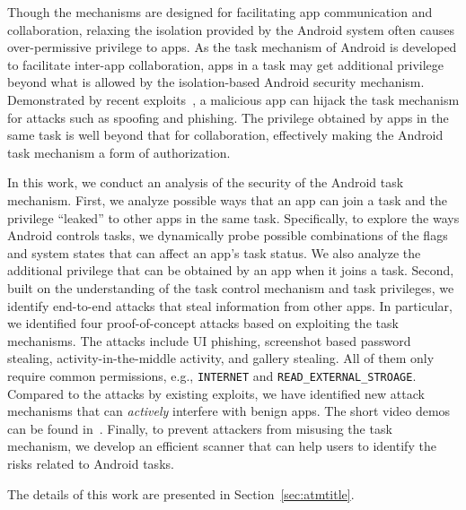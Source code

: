 \documentclass[letterpaper,12pt]{article}
\begin{document}
Though the mechanisms are designed for facilitating app communication
and collaboration, relaxing the isolation provided by the Android
system often causes over-permissive privilege to apps. 
As the task mechanism of Android is developed to facilitate inter-app
collaboration, apps in a task may get additional privilege beyond what
is allowed by the isolation-based Android security
mechanism. Demonstrated by recent exploits~\cite{TaskHijacking}, a
malicious app can hijack the task mechanism for attacks such as
spoofing and phishing. The privilege obtained by apps in the same task
is well beyond that for collaboration, effectively making the Android
task mechanism a form of authorization.

In this work, we conduct an analysis of the security of the Android
task mechanism. First, we analyze possible ways that an app can join a task
and the privilege ``leaked'' to other apps in the same
task. Specifically, to explore the ways Android controls tasks, we
dynamically probe possible combinations of the flags and system states
that can affect an app's task status.  We also analyze the additional
privilege that can be obtained by an app when it joins a task. Second, built on the understanding of the task control mechanism and task privileges, we identify end-to-end attacks that steal information from other apps. In particular, we identified four proof-of-concept attacks based on exploiting the task mechanisms. The attacks include
UI phishing, screenshot based password stealing, activity-in-the-middle
activity, and gallery stealing. All of them only require common
permissions, e.g., \texttt{INTERNET} and \texttt{READ\_EXTERNAL\_STROAGE}. Compared to
the attacks by existing exploits, we have identified new attack
mechanisms that can {\em actively} interfere with benign apps. The
short video demos can be found in~\cite{demo}. Finally, to prevent attackers from misusing the task mechanism, we develop an efficient scanner that can help users to
identify the risks related to Android tasks.

The details of this work are presented in Section~\ref{sec:atmtitle}. 
\end{document}
